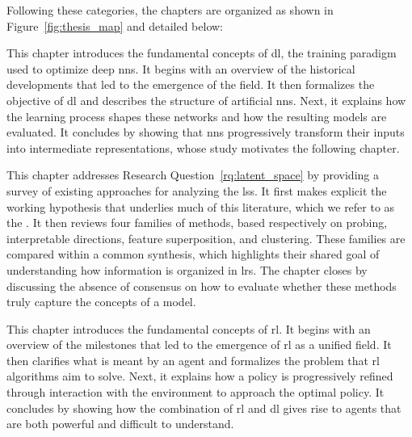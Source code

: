 Following these categories, the chapters are organized as shown in Figure~\ref{fig:thesis_map} and detailed below:
\begin{description}[style=nextline, leftmargin=1.5em, itemsep=0.5em]
\item[\textcolor{myblue}{\textbf{Deep Learning (Chapter~\ref{chap:deep_learning}, technical background)}}]
This chapter introduces the fundamental concepts of \gls{dl}, the training paradigm used to optimize deep \glspl{nn}.
It begins with an overview of the historical developments that led to the emergence of the field.
It then formalizes the objective of \gls{dl} and describes the structure of artificial \glspl{nn}.
Next, it explains how the learning process shapes these networks and how the resulting models are evaluated.
It concludes by showing that \glspl{nn} progressively transform their inputs into intermediate representations, whose study motivates the following chapter.

\item[\textcolor{mygreen}{\textbf{Latent Space Analysis (Chapter~\ref{chap:latent_space_analysis}, survey)}}]
This chapter addresses Research Question~\ref{rq:latent_space} by providing a survey of existing approaches for analyzing the \glspl{ls}.
It first makes explicit the working hypothesis that underlies much of this literature, which we refer to as the \ConceptHypothesisName.
It then reviews four families of methods, based respectively on probing, interpretable directions, feature superposition, and clustering.
These families are compared within a common synthesis, which highlights their shared goal of understanding how information is organized in \glspl{lr}.
The chapter closes by discussing the absence of consensus on how to evaluate whether these methods truly capture the concepts of a model.

\item[\textcolor{myblue}{\textbf{Reinforcement Learning (Chapter~\ref{chap:reinforcement_learning}, technical background)}}]
This chapter introduces the fundamental concepts of \gls{rl}.
It begins with an overview of the milestones that led to the emergence of \gls{rl} as a unified field.
It then clarifies what is meant by an agent and formalizes the problem that \gls{rl} algorithms aim to solve.
Next, it explains how a policy is progressively refined through interaction with the environment to approach the optimal policy.
It concludes by showing how the combination of \gls{rl} and \gls{dl} gives rise to agents that are both powerful and difficult to understand.


\end{description}
